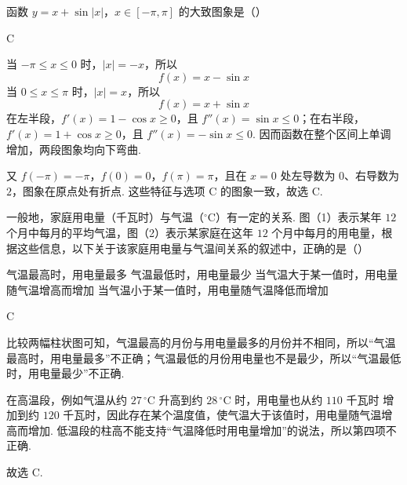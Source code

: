 \begin{problem}
函数 \(y = x + \sin |x|\)，\(x \in [-\pi, \pi]\) 的大致图象是（\quad）

    {}
    {}
    {}

\begin{answer}
C
\end{answer}

\begin{solution}
当 \(-\pi\leqslant x\leqslant0\) 时，\(|x|=-x\)，所以
\[
f(x)=x-\sin x
\]
当 \(0\leqslant x\leqslant\pi\) 时，\(|x|=x\)，所以
\[
f(x)=x+\sin x
\]
在左半段，\(f'(x)=1-\cos x\geqslant0\)，且 \(f''(x)=\sin x\leqslant0\)；在右半段，\(f'(x)=1+\cos x\geqslant0\)，且 \(f''(x)=-\sin x\leqslant0\). 因而函数在整个区间上单调增加，两段图象均向下弯曲.

又 \(f(-\pi)=-\pi\)，\(f(0)=0\)，\(f(\pi)=\pi\)，且在 \(x=0\) 处左导数为 \(0\)、右导数为 \(2\)，图象在原点处有折点. 这些特征与选项 C 的图象一致，故选 C.
\end{solution}
\end{problem}

\begin{problem}
一般地，家庭用电量（千瓦时）与气温（\(^{\circ}\mathrm{C}\)）有一定的关系. 图（1）表示某年 \(12\) 个月中每月的平均气温，图（2）表示某家庭在这年 \(12\) 个月中每月的用电量，根据这些信息，以下关于该家庭用电量与气温间关系的叙述中，正确的是（\quad）


\choices
    {气温最高时，用电量最多}
    {气温最低时，用电量最少}
    {当气温大于某一值时，用电量随气温增高而增加}
    {当气温小于某一值时，用电量随气温降低而增加}

\begin{answer}
C
\end{answer}

\begin{solution}
比较两幅柱状图可知，气温最高的月份与用电量最多的月份并不相同，所以“气温最高时，用电量最多”不正确；气温最低的月份用电量也不是最少，所以“气温最低时，用电量最少”不正确.

在高温段，例如气温从约 \(27\,^{\circ}\mathrm{C}\) 升高到约 \(28\,^{\circ}\mathrm{C}\) 时，用电量也从约 \(110\text{ 千瓦时}\) 增加到约 \(120\text{ 千瓦时}\)，因此存在某个温度值，使气温大于该值时，用电量随气温增高而增加. 低温段的柱高不能支持“气温降低时用电量增加”的说法，所以第四项不正确.

故选 C.
\end{solution}
\end{problem}

